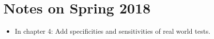 \documentclass{article}
\begin{document}
\section{Notes on Spring 2018}

\begin{itemize}
\item In chapter 4: Add specificities and sensitivities of real world tests.
\end{itemize}
\end{document}
